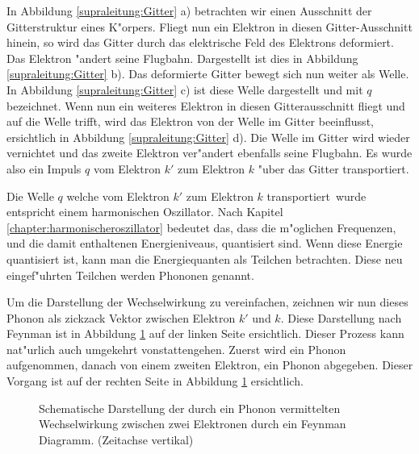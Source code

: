 \begin{refsection}
In Abbildung \ref{supraleitung:Gitter} a) betrachten wir einen Ausschnitt der Gitterstruktur eines K"orpers.
Fliegt nun ein Elektron in diesen Gitter-Ausschnitt hinein, so wird das Gitter durch das
elektrische Feld des Elektrons deformiert.
Das Elektron "andert seine Flugbahn.
Dargestellt ist dies in Abbildung \ref{supraleitung:Gitter} b).
Das deformierte Gitter bewegt sich nun weiter als Welle.
In Abbildung \ref{supraleitung:Gitter} c) ist diese Welle dargestellt und mit $q$ bezeichnet.
Wenn nun ein weiteres Elektron in diesen Gitterausschnitt fliegt und auf die Welle trifft,
wird das Elektron von der Welle im Gitter beeinflusst, ersichtlich in Abbildung \ref{supraleitung:Gitter} d).
Die Welle im Gitter wird wieder vernichtet und das zweite Elektron ver"andert
ebenfalls seine Flugbahn.
Es wurde also ein Impuls $q$ vom Elektron $k'$ zum Elektron $k$ "uber das Gitter transportiert. 

Die Welle $q$ welche vom Elektron $k'$ zum Elektron $k$ \glqq transportiert\grqq~wurde
entspricht einem harmonischen Oszillator.
Nach Kapitel \ref{chapter:harmonischeroszillator} bedeutet das, dass die m"oglichen Frequenzen,
und die damit enthaltenen Energieniveaus, quantisiert sind.
Wenn diese Energie quantisiert ist, kann man die Energiequanten als Teilchen betrachten.
Diese neu eingef"uhrten Teilchen werden Phononen  genannt.

Um die Darstellung der Wechselwirkung zu vereinfachen, zeichnen wir nun dieses Phonon
als zickzack Vektor zwischen Elektron $k'$ und $k$. Diese Darstellung nach Feynman
ist in Abbildung \ref{supraleitung:FeynmanDiagram1} auf der linken Seite ersichtlich.
Dieser Prozess kann nat"urlich auch umgekehrt vonstattengehen.
Zuerst wird ein Phonon aufgenommen, danach von einem zweiten Elektron, ein Phonon abgegeben.
Dieser Vorgang ist auf der rechten Seite in Abbildung \ref{supraleitung:FeynmanDiagram1} ersichtlich.

\begin{figure} %
\centering

\caption{Schematische Darstellung der durch ein Phonon vermittelten
Wechselwirkung zwischen zwei Elektronen durch ein Feynman Diagramm.
\cite{supraleitung:feynman}
(Zeitachse vertikal)
\label{supraleitung:FeynmanDiagram1}}
\end{figure}


\end{refsection}
